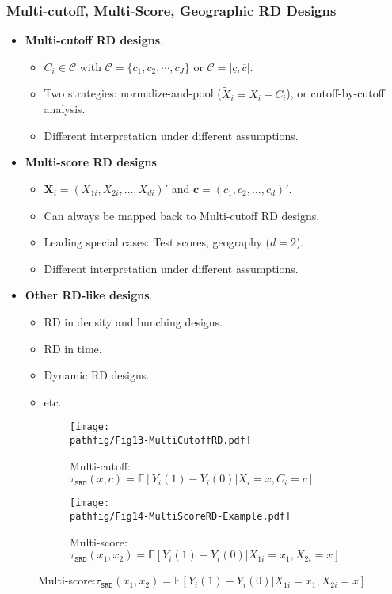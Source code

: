\documentclass[9pt]{beamer}
\newcommand{\E}{\mathbb{E}}
\renewcommand{\c}{c}
\newcommand{\pathfig}{figures}
\begin{document}
\begin{frame}\frametitle{Multi-cutoff, Multi-Score, Geographic RD Designs}
	\begin{itemize}
		\item \textbf{Multi-cutoff RD designs}.\medskip
		\begin{itemize}
			\item $C_{i}\in\mathcal{C}$ with $\mathcal{C}=\{c_{1},c_{2},\cdots,c_{J}\}$ or $\mathcal{C}=\mathcal{[}\underline{c},\overline{c}]$.\medskip
			\item Two strategies: normalize-and-pool ($\tilde{X}_{i}=X_{i}-C_{i}$), or cutoff-by-cutoff analysis.\medskip
			\item Different interpretation under different assumptions.\bigskip
		\end{itemize}
		
		\item \textbf{Multi-score RD designs}.\medskip
		\begin{itemize}
			\item $\mathbf{X}_{i}=(X_{1i},X_{2i},\dots,X_{di})'$ and $\mathbf{\c}=(\c_1,\c_2,\dots,c_d)'$.\medskip
			\item Can always be mapped back to Multi-cutoff RD designs.\medskip
			\item Leading special cases: Test scores, geography ($d=2$).\medskip
			\item Different interpretation under different assumptions.\bigskip
		\end{itemize}
		
		\item \textbf{Other RD-like designs}.\medskip
		\begin{itemize}
			\item RD in density and bunching designs.\medskip
			\item RD in time.\medskip
			\item Dynamic RD designs.\medskip
			\item etc.
		\end{itemize}
	\end{itemize}
\end{frame}

\begin{frame}
	\begin{figure}[h]
		\begin{subfigure}[t]{0.48\textwidth}
			\centering
			\texttt{[image: \\pathfig/Fig13-MultiCutoffRD.pdf]}
			\caption{Multi-cutoff:\newline $\tau_\mathtt{SRD}(x,c)=\E[Y_i(1)-Y_i(0)|X_i=x,C_i=c]$}       
		\end{subfigure}
		\begin{subfigure}[t]{0.5\textwidth}
			\centering
			\texttt{[image: \\pathfig/Fig14-MultiScoreRD-Example.pdf]}
			\caption{Multi-score:\newline $\tau_\mathtt{SRD}(x_1,x_2)=\E[Y_i(1)-Y_i(0)|X_{1i}=x_1,X_{2i}=x]$}
		\end{subfigure}
	\end{figure}
\end{frame}
\end{document}
